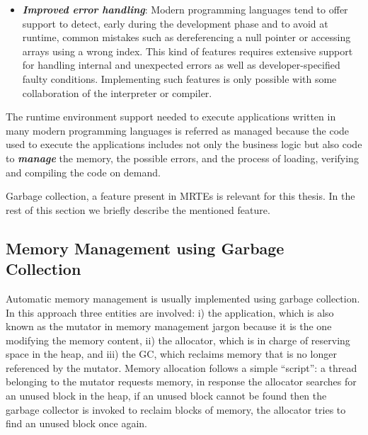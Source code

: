 \begin{itemize}
\item \textbf{\textit{Improved error handling}}:
Modern programming languages tend to offer support to detect, early during the development phase and to avoid at runtime, common mistakes such as dereferencing a null pointer or accessing arrays using a wrong index.
This kind of features requires extensive support for handling internal and unexpected errors as well as developer-specified faulty conditions.
Implementing such features is only possible with some collaboration of the interpreter or  compiler.
\end{itemize}   

The runtime environment support needed to execute applications written in many modern programming languages is referred as managed because the code used to execute the applications includes not only the business logic but also code to \textit{\textbf{manage}} the memory, the possible errors, and the process of loading, verifying and compiling the code on demand.

Garbage collection, a feature present in MRTEs is relevant for this thesis.
In the rest of this section we briefly describe the mentioned feature.

\subsection{Memory Management using Garbage Collection}

Automatic memory management is usually implemented using garbage collection.
In this approach three entities are involved: i) the application, which is also known as the mutator in memory management jargon because it is the one modifying the memory content, ii) the allocator, which is in charge of reserving space in the heap, and iii) the \gls{GC}, which reclaims memory that is no longer referenced by the mutator.
Memory allocation follows a simple ``script'': a thread belonging to the mutator requests memory, in response the allocator searches for an unused block in the heap, if an unused block cannot be found then the garbage collector is invoked to reclaim blocks of memory, the allocator tries to find an unused block once again.

